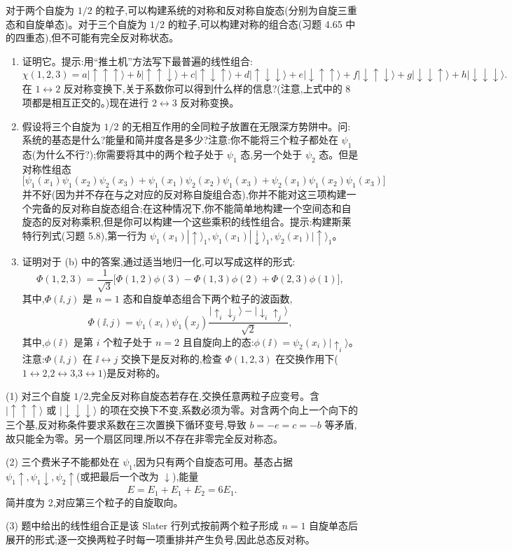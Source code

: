 \begin{question}
对于两个自旋为 $1/2$ 的粒子,可以构建系统的对称和反对称自旋态(分别为自旋三重态和自旋单态)。对于三个自旋为 $1/2$ 的粒子,可以构建对称的组合态(习题 4.65 中的四重态),但不可能有完全反对称状态。
\begin{enumerate}
\item 证明它。提示:用“推土机”方法写下最普遍的线性组合:
\[
\chi(1,2,3)=a|\uparrow\uparrow\uparrow\rangle+b|\uparrow\uparrow\downarrow\rangle+c|\uparrow\downarrow\uparrow\rangle+d|\uparrow\downarrow\downarrow\rangle+e|\downarrow\uparrow\uparrow\rangle+f|\downarrow\uparrow\downarrow\rangle+g|\downarrow\downarrow\uparrow\rangle+h|\downarrow\downarrow\downarrow\rangle.
\]
在 $1\leftrightarrow 2$ 反对称变换下,关于系数你可以得到什么样的信息?(注意,上式中的 8 项都是相互正交的。)现在进行 $2\leftrightarrow 3$ 反对称变换。
\item 假设将三个自旋为 $1/2$ 的无相互作用的全同粒子放置在无限深方势阱中。问:系统的基态是什么?能量和简并度各是多少?注意:你不能将三个粒子都处在 $\psi_1$ 态(为什么不行?);你需要将其中的两个粒子处于 $\psi_1$ 态,另一个处于 $\psi_2$ 态。但是对称性组态
\[
\bigl[\psi_1(x_1)\psi_1(x_2)\psi_2(x_3)+\psi_1(x_1)\psi_2(x_2)\psi_1(x_3)+\psi_2(x_1)\psi_1(x_2)\psi_1(x_3)\bigr]
\]
并不好(因为并不存在与之对应的反对称自旋组合态),你并不能对这三项构建一个完备的反对称自旋态组合;在这种情况下,你不能简单地构建一个空间态和自旋态的反对称乘积,但是你可以构建一个这些乘积的线性组合。提示:构建斯莱特行列式(习题 5.8),第一行为 $\psi_1(x_1)|\uparrow\rangle_1,\psi_1(x_1)|\downarrow\rangle_1,\psi_2(x_1)|\uparrow\rangle_1$。
\item 证明对于 (b) 中的答案,通过适当地归一化,可以写成这样的形式:
\[
\Phi(1,2,3)=\frac{1}{\sqrt3}\bigl[\Phi(1,2)\phi(3)-\Phi(1,3)\phi(2)+\Phi(2,3)\phi(1)\bigr],
\]
其中,$\Phi(\ii,j)$ 是 $n=1$ 态和自旋单态组合下两个粒子的波函数,
\[
\Phi(\ii,j)=\psi_1(x_i)\psi_1(x_j)\frac{|\uparrow_i\downarrow_j\rangle-|\downarrow_i\uparrow_j\rangle}{\sqrt2},
\]
其中,$\phi(\ii)$ 是第 $i$ 个粒子处于 $n=2$ 且自旋向上的态:$\phi(\ii)=\psi_2(x_i)|\uparrow_i\rangle$。注意:$\Phi(\ii,j)$ 在 $\ii\leftrightarrow j$ 交换下是反对称的,检查 $\Phi(1,2,3)$ 在交换作用下($1\leftrightarrow2$,$2\leftrightarrow3$,$3\leftrightarrow1$)是反对称的。
\end{enumerate}
\begin{solution}

(1) 对三个自旋 $1/2$,完全反对称自旋态若存在,交换任意两粒子应变号。含 $|\uparrow\uparrow\uparrow\rangle$ 或 $|\downarrow\downarrow\downarrow\rangle$ 的项在交换下不变,系数必须为零。对含两个向上一个向下的三个基,反对称条件要求系数在三次置换下循环变号,导致 $b=-e=c=-b$ 等矛盾,故只能全为零。另一个扇区同理,所以不存在非零完全反对称态。

(2) 三个费米子不能都处在 $\psi_1$,因为只有两个自旋态可用。基态占据 $\psi_1\uparrow,\psi_1\downarrow,\psi_2\uparrow$(或把最后一个改为 $\downarrow$),能量
\[
E=E_1+E_1+E_2=6E_1.
\]
简并度为 2,对应第三个粒子的自旋取向。

(3) 题中给出的线性组合正是该 Slater 行列式按前两个粒子形成 $n=1$ 自旋单态后展开的形式;逐一交换两粒子时每一项重排并产生负号,因此总态反对称。

\end{solution}
\end{question}

